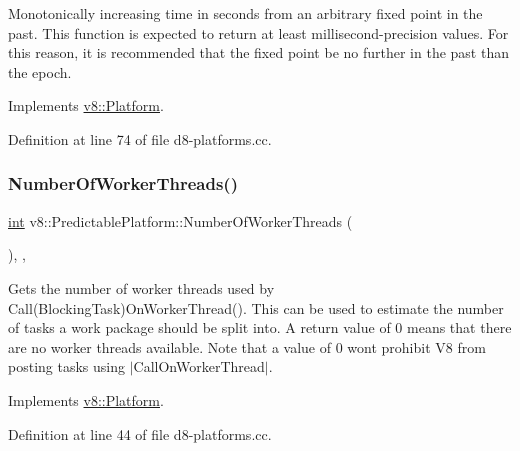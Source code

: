 Monotonically increasing time in seconds from an arbitrary fixed point in the past. This function is expected to return at least millisecond-\/precision values. For this reason, it is recommended that the fixed point be no further in the past than the epoch. 

Implements \mbox{\hyperlink{classv8_1_1Platform_a6d4d7c2dcf6b0c7113099b97fa7f57b7}{v8\+::\+Platform}}.



Definition at line 74 of file d8-\/platforms.\+cc.

\mbox{\label{classv8_1_1PredictablePlatform_abe8bf7e862a8403649bb3548ceab61ff}} 
\subsubsection{\texorpdfstring{Number\+Of\+Worker\+Threads()}{NumberOfWorkerThreads()}}
{\footnotesize\ttfamily \mbox{\hyperlink{classint}{int}} v8\+::\+Predictable\+Platform\+::\+Number\+Of\+Worker\+Threads (\begin{DoxyParamCaption}{ }\end{DoxyParamCaption})\hspace{0.3cm}{\ttfamily [inline]}, {\ttfamily [override]}, {\ttfamily [virtual]}}

Gets the number of worker threads used by Call(\+Blocking\+Task)On\+Worker\+Thread(). This can be used to estimate the number of tasks a work package should be split into. A return value of 0 means that there are no worker threads available. Note that a value of 0 won\textquotesingle{}t prohibit V8 from posting tasks using $\vert$\+Call\+On\+Worker\+Thread$\vert$. 

Implements \mbox{\hyperlink{classv8_1_1Platform_a57cdd7eb4c482bfb806c378beeda716d}{v8\+::\+Platform}}.



Definition at line 44 of file d8-\/platforms.\+cc.

\mbox{\label{classv8_1_1PredictablePlatform_abeea60c323e795787753638133ff525e}} 
